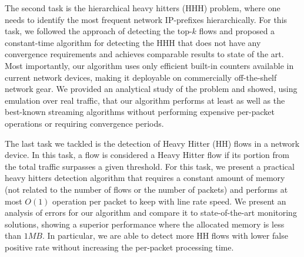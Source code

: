 {The second task is the hierarchical heavy hitters (HHH) problem, where one needs to identify the most frequent network IP-prefixes hierarchically. For this task, we followed the approach of detecting the top-$k$ flows and proposed a constant-time algorithm for detecting the HHH that does not have any convergence requirements and achieves comparable results to state of the art.
Most importantly, our algorithm uses only efficient built-in counters available in current network devices, making it deployable on commercially off-the-shelf network gear.
We provided an analytical study of the problem and showed, using emulation over real traffic, that our algorithm performs at least as well as the best-known streaming algorithms without performing expensive per-packet operations or requiring convergence periods.

The last task we tackled is the detection of Heavy Hitter (HH) flows in a network device. In this task, a flow is considered a Heavy Hitter flow if its portion from the total traffic surpasses a given threshold. For this task, we present a practical heavy hitters detection algorithm that requires a constant amount of memory (not related to the number of flows or the number of packets) and performs at most $O(1)$ operation per packet to keep with line rate speed. We present an analysis of errors for our algorithm and compare it to state-of-the-art monitoring solutions, showing a superior performance where the allocated memory is less than $1MB$. In particular, we are able to detect more HH flows with lower false positive rate without increasing the per-packet processing time.

} %


